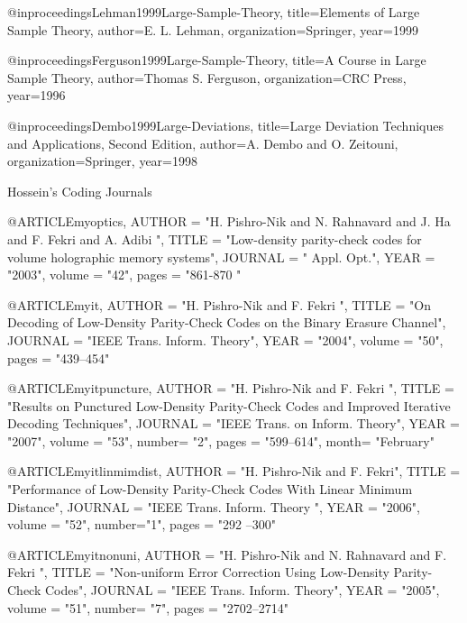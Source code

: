 {{{{{{@inproceedings{Lehman1999Large-Sample-Theory,
	title={Elements of Large Sample Theory},
	author={E. L. Lehman},
	organization={Springer},
	year={1999}
}


@inproceedings{Ferguson1999Large-Sample-Theory,
	title={A Course in Large Sample Theory},
	author={Thomas S. Ferguson},
	organization={CRC Press},
	year={1996}
}



@inproceedings{Dembo1999Large-Deviations,
	title={Large Deviation Techniques and Applications, Second Edition},
	author={A. Dembo and O. Zeitouni},
	organization={Springer},
	year={1998}
}


Hossein's Coding Journals

@ARTICLE{myoptics,
	AUTHOR =       "H. Pishro-Nik and N. Rahnavard and J. Ha and F. Fekri and A. Adibi ",
	TITLE =        "Low-density parity-check codes for volume holographic memory systems",
	JOURNAL =      " Appl. Opt.",
	YEAR =         "2003",
	volume =       "42",
	pages =        "861-870  "
}






@ARTICLE{myit,
	AUTHOR =       "H. Pishro-Nik and F. Fekri  ",
	TITLE =        "On Decoding of Low-Density Parity-Check Codes on the Binary Erasure Channel",
	JOURNAL =      "IEEE Trans. Inform. Theory",
	YEAR =         "2004",
	volume =       "50",
	pages =        "439--454"
}




@ARTICLE{myitpuncture,
	AUTHOR =       "H. Pishro-Nik and F. Fekri  ",
	TITLE =        "Results on Punctured Low-Density Parity-Check Codes and Improved Iterative Decoding Techniques",
	JOURNAL =      "IEEE Trans. on Inform. Theory",
	YEAR =         "2007",
	volume =       "53",
	number=        "2",
	pages =        "599--614",
	month= "February"
}




@ARTICLE{myitlinmimdist,
	AUTHOR =       "H. Pishro-Nik and F. Fekri",
	TITLE =        "Performance of Low-Density Parity-Check Codes With Linear Minimum Distance",
	JOURNAL =         "IEEE Trans. Inform. Theory ",
	YEAR =         "2006",
	volume =       "52",
	number="1",
	pages =        "292 --300"
}






@ARTICLE{myitnonuni,
	AUTHOR =       "H. Pishro-Nik and N. Rahnavard and F. Fekri  ",
	TITLE =        "Non-uniform Error Correction Using Low-Density Parity-Check Codes",
	JOURNAL =      "IEEE Trans. Inform. Theory",
	YEAR =         "2005",
	volume =       "51",
	number=  "7",
	pages =        "2702--2714"
}





}}}}}}
